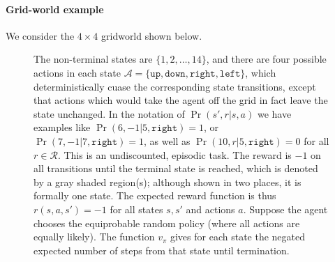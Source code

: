 \documentclass[12pt]{article}
\begin{document}
\paragraph{Grid-world example} We consider the $4 \times 4$ gridworld shown below.
\begin{figure}[h]
  \centering
  \caption{\footnotesize The non-terminal states are $\{1, 2, \ldots, 14\}$, and there are four possible actions in each state $\mathcal A = \{\texttt{up}, \texttt{down}, \texttt{right}, \texttt{left}\}$, which deterministically cuase the corresponding state transitions, except that actions which would take the agent off the grid in fact leave the state unchanged. In the notation of $\Pr(s',r|s,a)$ we have examples like $\Pr(6,-1|5,\texttt{right}) = 1$, or $\Pr(7, -1 | 7, \texttt{right}) = 1$, as well as $\Pr(10,r|5,\texttt{right}) = 0$ for all $r \in \mathcal R$. This is an undiscounted, episodic task. The reward is $-1$ on all transitions until the terminal state is reached, which is denoted by a gray shaded region(s); although shown in two places, it is formally one state. The expected reward function is thus $r(s,a,s') = -1$ for all states $s,s'$ and actions $a$. Suppose the agent chooses the equiprobable random policy (where all actions are equally likely). The function $v_\pi$ gives for each state the negated expected number of steps from that state until termination.}
\end{figure}
\end{document}
